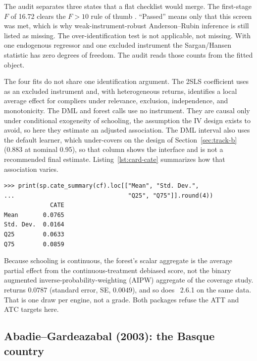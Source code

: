 The audit separates three states that a flat checklist would merge. The
first-stage \(F\) of 16.72 clears the \(F>10\) rule of thumb
\citep{staiger1997instrumental,stock2005testing}. ``Passed'' means only
that this screen was met, which is why weak-instrument-robust
Anderson--Rubin inference is still listed as missing. The
over-identification test is not applicable, not missing. With one
endogenous regressor and one excluded instrument the Sargan/Hansen
statistic has zero degrees of freedom. The audit reads those counts from
the fitted object.

The four fits do not share one identification argument. The 2SLS
coefficient uses  as an excluded instrument and, with
heterogeneous returns, identifies a local average effect for compliers
under relevance, exclusion, independence, and monotonicity. The DML and
forest calls use no instrument. They are causal only under conditional
exogeneity of schooling, the assumption the IV design exists to avoid, so
here they estimate an adjusted association. The DML interval also uses the default
learner, which under-covers on the design of Section~\ref{sec:track-b}
(0.883 at nominal 0.95), so that column shows the interface and is not a
recommended final estimate.
Listing~\ref{lst:card-cate} summarizes how that association varies.

\begin{lstlisting}[caption={Fitted conditional effects from the forest of
Listing~\ref{lst:motivating}. \code{Mean} is the plain average of the
fitted effects, not the forest's doubly-robust average. \proglang{R}
\pkg{grf} on the same data gives an interquartile range of 6.3\% to 8.7\%
around 7.6\%.},label={lst:card-cate},captionpos=b]
>>> print(sp.cate_summary(cf).loc[["Mean", "Std. Dev.",
...                                "Q25", "Q75"]].round(4))
             CATE
Mean       0.0765
Std. Dev.  0.0164
Q25        0.0633
Q75        0.0859
\end{lstlisting}

Because schooling is continuous, the forest's scalar aggregate is the
average partial effect from the continuous-treatment debiased score, not
the binary augmented inverse-probability-weighting (AIPW) aggregate of the
coverage study.  returns \(0.0787\)
(standard error, SE, \(0.0049\)), and so does ~2.6.1 on the same
data. That is one draw per engine, not a grade. Both packages refuse the
ATT and ATC targets here.

\subsection{Abadie--Gardeazabal (2003): the Basque country}\label{sec:ex-basque}

